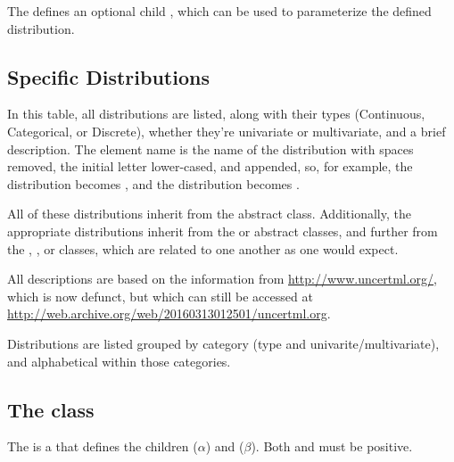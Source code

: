The \ExternalDistribution defines an optional child \ListOfExternalParameters, which can be used to parameterize the defined distribution.


\subsection{Specific Distributions}
\label{sec:allDistributions}

In this table, all distributions are listed, along with their types (Continuous, Categorical, or Discrete), whether they're univariate or multivariate, and a brief description.  The element name is the name of the distribution with spaces removed, the initial letter lower-cased, and  appended, so, for example, the  distribution becomes , and the  distribution becomes .

All of these distributions inherit from the abstract \Distribution class.  Additionally, the appropriate distributions inherit from the \UnivariateDistribution or \MultivariateDistribution abstract classes, and further from the \ContinuousUnivariateDistribution, \DiscreteUnivariateDistribution, or \CategoricalUnivariateDistribution classes, which are related to one another as one would expect.

All descriptions are based on the information from \url{http://www.uncertml.org/}, which is now defunct, but which can still be accessed at \url{http://web.archive.org/web/20160313012501/uncertml.org}.

Distributions are listed grouped by category (type and univarite/multivariate), and alphabetical within those categories.


\subsection{The  class}
\label{BetaDistribution-class}
\label{betadistribution-class}

The \BetaDistribution is a \ContinuousUnivariateDistribution that defines the \UncertValue children  ($\alpha$) and  ($\beta$).  Both  and  must be positive.

